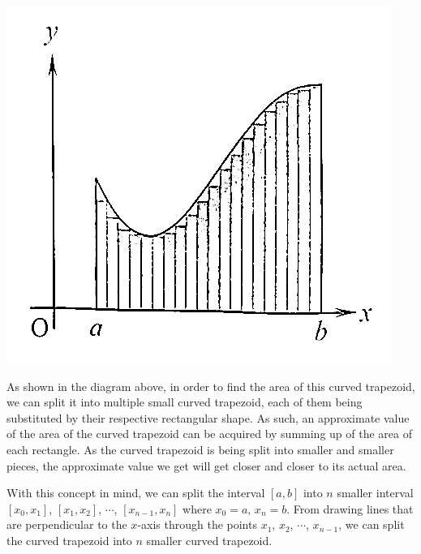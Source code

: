 \documentclass{report}
\begin{document}
\begin{center}
    \includegraphics[scale=0.3]{assets/28-4.jpg}
\end{center}

As shown in the diagram above, in order to find the area of this curved
trapezoid, we can split it into multiple small curved trapezoid, each of them
being substituted by their respective rectangular shape. As such, an
approximate value of the area of the curved trapezoid can be acquired by
summing up of the area of each rectangle. As the curved trapezoid is being
split into smaller and smaller pieces, the approximate value we get will get
closer and closer to its actual area.

With this concept in mind, we can split the interval $[a, b]$ into $n$ smaller
interval $[x_0, x_1]$, $[x_1, x_2]$, $\cdots$, $[x_{n-1}, x_n]$ where $x_0 =
    a$, $x_n = b$. From drawing lines that are perpendicular to the $x$-axis
through the points $x_1$, $x_2$, $\cdots$, $x_{n-1}$, we can split the curved
trapezoid into $n$ smaller curved trapezoid.
\end{document}
